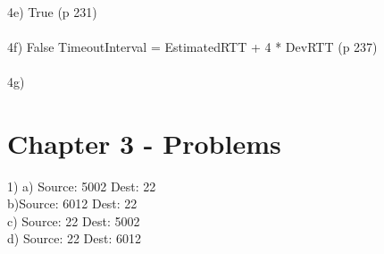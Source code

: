 \documentclass[a4paper,11pt]{article}
\begin{document}
\paragraph{}4e) True (p 231)

\paragraph{}4f) False TimeoutInterval = EstimatedRTT + 4 * DevRTT (p 237)

\paragraph{}4g)

\section{Chapter 3 - Problems}

\pararaph{}1) a) Source: 5002 Dest: 22\\b)Source: 6012 Dest: 22\\
c) Source: 22 Dest: 5002\\
d) Source: 22 Dest: 6012
\end{document}
